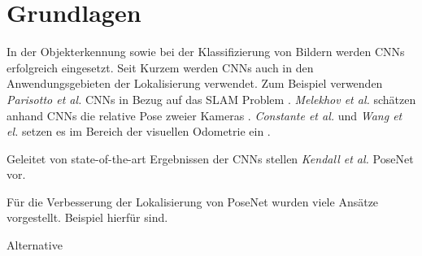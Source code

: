 \pagebreak
\section{Grundlagen}





\pagebreak
In der Objekterkennung \cite{girshickRichFeatureHierarchies2013, girshickFastRCNN2015} sowie bei der Klassifizierung von Bildern \cite{krizhevskyImageNetClassificationDeep2012, simonyanVeryDeepConvolutional2014, heDeepResidualLearning2015} werden CNNs erfolgreich eingesetzt.
Seit Kurzem werden CNNs auch in den Anwendungsgebieten der Lokalisierung verwendet. Zum Beispiel verwenden \textit{Parisotto et al.} CNNs in Bezug auf das SLAM Problem \cite{parisottoGlobalPoseEstimation2018}. \textit{Melekhov et al.} schätzen anhand CNNs die relative Pose zweier Kameras \cite{melekwashovRelativeCameraPose2017}. \textit{Constante et al.} und \textit{Wang et el.} setzen es im Bereich der visuellen Odometrie ein \cite{costanteExploringRepresentationLearning2016, wangDeepVOEndtoendVisual2017}.

Geleitet von state-of-the-art Ergebnissen der CNNs stellen \textit{Kendall et al.} PoseNet vor.

Für die Verbesserung der Lokalisierung von PoseNet wurden viele Ansätze vorgestellt. Beispiel hierfür sind.



Alternative 


% 
